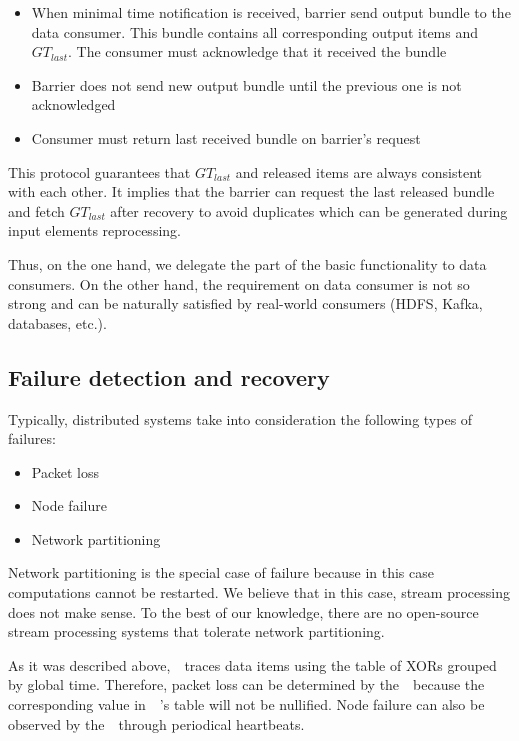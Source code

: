 \begin{itemize}
    \item When minimal time notification is received, barrier send output bundle to the data consumer. This bundle contains all corresponding output items and $GT_{last}$. The consumer must acknowledge that it received the bundle
    \item Barrier does not send new output bundle until the previous one is not acknowledged
    \item Consumer must return last received bundle on barrier's request 
\end{itemize}

This protocol guarantees that $GT_{last}$ and released items are always consistent with each other. It implies that the barrier can request the last released bundle and fetch $GT_{last}$ after recovery to avoid duplicates which can be generated during input elements reprocessing.

Thus, on the one hand, we delegate the part of the basic functionality to data consumers. On the other hand, the requirement on data consumer is not so strong and can be naturally satisfied by real-world consumers (HDFS, Kafka, databases, etc.). 

\subsection{Failure detection and recovery}

Typically, distributed systems take into consideration the following types of failures:
\begin{itemize}
    \item Packet loss
    \item Node failure
    \item Network partitioning
\end{itemize}

Network partitioning is the special case of failure because in this case computations cannot be restarted. We believe that in this case, stream processing does not make sense. To the best of our knowledge, there are no open-source stream processing systems that tolerate network partitioning.

As it was described above,~\Acker\ traces data items using the table of XORs grouped by global time. Therefore, packet loss can be determined by the~\Acker\ because the corresponding value in~\Acker\ 's table will not be nullified. Node failure can also be observed by the~\Acker\ through periodical heartbeats. 

